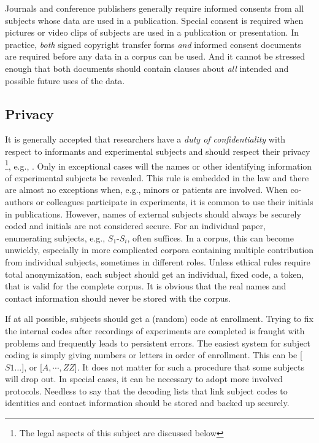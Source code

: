 \documentclass[10pt, a4paper]{article}
\begin{document}
Journals and conference publishers generally require informed consents from all subjects whose data are used in a publication. Special consent is required when pictures or video clips of subjects are used in a publication or presentation. In practice, \emph{both} signed copyright transfer forms \emph{and} informed consent documents are required before any data in a corpus can be used. And it cannot be stressed enough that both documents should contain clauses about \emph{all} intended and possible future uses of the data.

\subsection{Privacy}

It is generally accepted that researchers have a \emph{duty of confidentiality} with respect to informants and experimental subjects and should respect their privacy \footnote{The legal aspects of this subject are discussed below}, e.g., \cite{FQS1024}. Only in exceptional cases will the names or other identifying information of experimental subjects be revealed. This rule is embedded in the law and there are almost no exceptions when, e.g., minors or patients are involved. When co-authors or colleagues participate in experiments, it is common to use their initials in publications. However, names of external subjects should always be securely coded and initials are not considered secure. For an individual paper, enumerating subjects, e.g., $S_1$-$S_i$, often suffices. In a corpus, this can become unwieldy, especially in more complicated corpora containing multiple contribution from individual subjects, sometimes in different roles. Unless ethical rules require total anonymization, each subject should get an individual, fixed code, a token, that is valid for the complete corpus. It is obvious that the real names and contact information should never be stored with the corpus.

If at all possible, subjects should get a (random) code at enrollment. Trying to fix the internal codes after recordings of experiments are completed is fraught with problems and frequently leads to persistent errors. The easiest system for subject coding is simply giving numbers or letters in order of enrollment. This can be [$S1\dots$], or [$A, \cdots , ZZ$]. It does not matter for such a procedure that some subjects will drop out. In special cases, it can be necessary to adopt more involved protocols. Needless to say that the decoding lists that link subject codes to identities and contact information should be stored and backed up securely.
\end{document}
